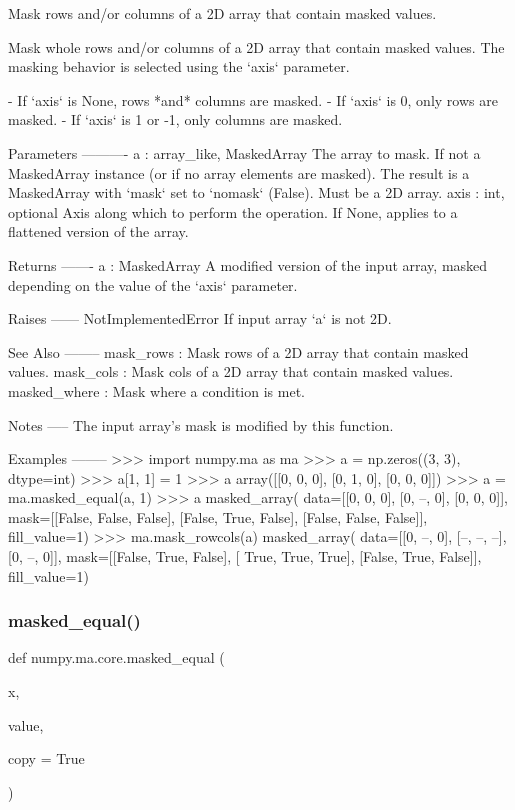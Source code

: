 \begin{DoxyVerb}Mask rows and/or columns of a 2D array that contain masked values.

Mask whole rows and/or columns of a 2D array that contain
masked values.  The masking behavior is selected using the
`axis` parameter.

  - If `axis` is None, rows *and* columns are masked.
  - If `axis` is 0, only rows are masked.
  - If `axis` is 1 or -1, only columns are masked.

Parameters
----------
a : array_like, MaskedArray
    The array to mask.  If not a MaskedArray instance (or if no array
    elements are masked).  The result is a MaskedArray with `mask` set
    to `nomask` (False). Must be a 2D array.
axis : int, optional
    Axis along which to perform the operation. If None, applies to a
    flattened version of the array.

Returns
-------
a : MaskedArray
    A modified version of the input array, masked depending on the value
    of the `axis` parameter.

Raises
------
NotImplementedError
    If input array `a` is not 2D.

See Also
--------
mask_rows : Mask rows of a 2D array that contain masked values.
mask_cols : Mask cols of a 2D array that contain masked values.
masked_where : Mask where a condition is met.

Notes
-----
The input array's mask is modified by this function.

Examples
--------
>>> import numpy.ma as ma
>>> a = np.zeros((3, 3), dtype=int)
>>> a[1, 1] = 1
>>> a
array([[0, 0, 0],
       [0, 1, 0],
       [0, 0, 0]])
>>> a = ma.masked_equal(a, 1)
>>> a
masked_array(
  data=[[0, 0, 0],
        [0, --, 0],
        [0, 0, 0]],
  mask=[[False, False, False],
        [False,  True, False],
        [False, False, False]],
  fill_value=1)
>>> ma.mask_rowcols(a)
masked_array(
  data=[[0, --, 0],
        [--, --, --],
        [0, --, 0]],
  mask=[[False,  True, False],
        [ True,  True,  True],
        [False,  True, False]],
  fill_value=1)\end{DoxyVerb}
 \mbox{\label{namespacenumpy_1_1ma_1_1core_a001a5dffe6870e8ffa646499d498ec2f}} 
\subsubsection{\texorpdfstring{masked\+\_\+equal()}{masked\_equal()}}
{\footnotesize\ttfamily def numpy.\+ma.\+core.\+masked\+\_\+equal (\begin{DoxyParamCaption}\item[{}]{x,  }\item[{}]{value,  }\item[{}]{copy = {\ttfamily True} }\end{DoxyParamCaption})}

